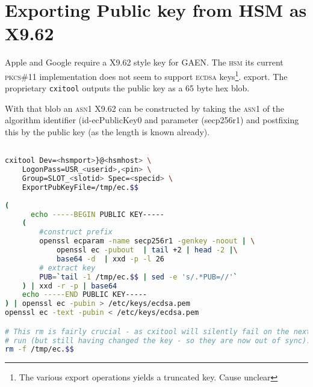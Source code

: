 \documentclass[11pt,a4]{article}
\begin{document}
\preamble
\newcommand{\chapter}{\section}

\section*{Exporting Public key from HSM as X9.62}

Apple and Google require a X9.62 style key for GAEN. The \textsc{hsm} its current \textsc{pkcs\#11} implementation does not seem to support \textsc{ecdsa} keys\footnote{The various export operations yields a truncated key. Cause unclear}. export. The proprietary { \texttt{cxitool}} outputs the public key as a 65 byte hex blob.

With that blob an \textsc{asn1} X9.62 can be constructed by taking the \textsc{asn1} of the algorithm identifier (id-ecPublicKey0  and parameter (secp256r1) and postfixing this by the public key (as the length is known already).

\begin{lstlisting}[language=bash,]

cxitool Dev=<hsmport>}@<hsmhost> \
	LogonPass=USR_<userid>,<pin> \
	Group=SLOT_<slotid> Spec=<specid> \
	ExportPubKeyFile=/tmp/ec.$$
	
(
	  echo -----BEGIN PUBLIC KEY----- 
	(
		#construct prefix
		openssl ecparam -name secp256r1 -genkey -noout | \
			openssl ec -pubout  | tail +2 | head -2 |\
			base64 -d  | xxd -p -l 26
		# extract key 
		PUB=`tail -1 /tmp/ec.$$ | sed -e 's/.*PUB=//'`
	) | xxd -r -p | base64
	echo -----END PUBLIC KEY----- 
) | openssl ec -pubin > /etc/keys/ecdsa.pem
openssl ec -text -pubin < /etc/keys/ecdsa.pem

# This rm is fairly crucial - as cxitool will silently fail on the next
# run (but still having changed the key - so they are now out of sync).
rm -f /tmp/ec.$$

\end{lstlisting}



\closingpage
\end{document}
